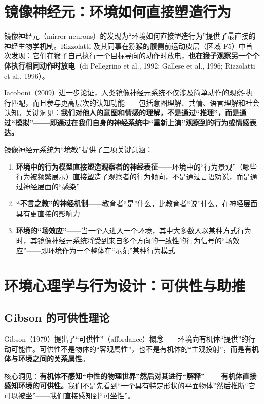 \documentclass[UTF8,12pt,a4paper]{ctexart}
\begin{document}
\section{镜像神经元：环境如何直接塑造行为}

镜像神经元（mirror neurons）的发现为``环境如何直接塑造行为''提供了最直接的神经生物学机制。Rizzolatti 及其同事在猕猴的腹侧前运动皮层（区域 F5）中首次发现：它们在猴子自己执行一个目标导向的动作时放电，\textbf{也在猴子观察另一个个体执行相同动作时放电}（di Pellegrino et al., 1992; Gallese et al., 1996; Rizzolatti et al., 1996）。

Iacoboni（2009）进一步论证，人类镜像神经元系统不仅涉及简单动作的观察-执行匹配，而且参与更高层次的认知功能——包括意图理解、共情、语言理解和社会认知。关键洞见：\textbf{我们对他人的意图和情感的理解，不是通过``推理''，而是通过``模拟''——即通过在我们自身的神经系统中``重新上演''观察到的行为或情感表达。}

镜像神经元系统为``境教''提供了三项关键意涵：

\begin{enumerate}[nosep]
    \item \textbf{环境中的行为模型直接塑造观察者的神经表征}——环境中的``行为景观''（哪些行为被频繁展示）直接塑造了观察者的行为倾向，不是通过言语劝说，而是通过神经层面的``感染''
    \item \textbf{``不言之教''的神经机制}——教育者``是''什么，比教育者``说''什么，在神经层面具有更直接的影响力
    \item \textbf{环境的``场效应''}——当一个人进入一个环境，其中大多数人以某种方式行为时，其镜像神经元系统将受到来自多个方向的一致性的行为信号的``场效应''——即环境作为一个整体在``示范''某种行为模式
\end{enumerate}

\section{环境心理学与行为设计：可供性与助推}

\subsection{Gibson 的可供性理论}

Gibson（1979）提出了``可供性''（affordance）概念——环境向有机体``提供''的行动可能性。可供性不是物体的``客观属性''，也不是有机体的``主观投射''，而是\textbf{有机体与环境之间的关系属性}。

核心洞见：\textbf{有机体不感知``中性的物理世界''然后对其进行``解释''——有机体直接感知环境的可供性。}我们不是先看到``一个具有特定形状的平面物体''然后推断``它可以被坐''——我们直接感知到``可坐性''。
\end{document}
